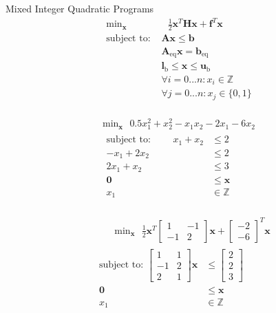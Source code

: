 \documentclass{article}
\begin{document}
Mixed Integer Quadratic Programs
\begin{align*}
    \text{min}_{\mathbf{x}}& \text{ } \frac{1}{2}\mathbf{x}^T \mathbf{H} \mathbf{x} + \mathbf{f}^T \mathbf{x} \\
    \mbox{subject to: }& \mathbf{A}\mathbf{x} \le \mathbf{b}\\
                       & \mathbf{A}_{\text{eq}}\mathbf{x} = \mathbf{b}_{\text{eq}}\\
                       & \mathbf{l}_{\text{b}} \le \mathbf{x} \le \mathbf{u}_{\text{b}}\\
                       & \forall i = 0...n : x_i \in \mathbb{Z}\\
                       & \forall j = 0...n : x_j \in \{0,1\}\\
\end{align*}

\begin{align*}
    \text{min}_{\mathbf{x}} \text{ } 0.5x_1^2 + x_2^2 - x_1x_2 - 2x_1 - 6x_2\\
    \begin{aligned}
    \mbox{subject to: } \qquad x_1 + x_2 &\le 2\\
                        -x_1 + 2x_2 &\le 2\\
                        2x_1 + x_2 &\le 3\\
                        \mathbf{0} &\le \mathbf{x}\\
                        x_1 &\in \mathbb{Z}\\
    \end{aligned}
\end{align*}

\begin{align*}
    &\qquad \text{min}_{\mathbf{x}} \text{ } \frac{1}{2}\mathbf{x}^T \begin{bmatrix} 1 & -1 \\ -1 & 2 \end{bmatrix} \mathbf{x} +
                                        \begin{bmatrix} -2 \\ -6 \end{bmatrix}^T \mathbf{x}\\
    &\begin{aligned}
    \mbox{subject to: } \begin{bmatrix} 1 & 1 \\ -1 & 2 \\ 2 & 1 \end{bmatrix} \mathbf{x} &\le \begin{bmatrix} 2 \\ 2 \\ 3 \end{bmatrix}\\
                        \mathbf{0} &\le \mathbf{x}\\
                        x_1 &\in \mathbb{Z}\\
    \end{aligned}
\end{align*}
\end{document}
